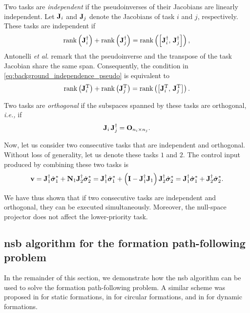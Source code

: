 Two tasks are \emph{independent} if the pseudoinverses of their Jacobians are linearly independent.
Let $\mathbf{J}_i$ and $\mathbf{J}_j$ denote the Jacobians of task $i$ and $j$, respectively.
These tasks are independent if
\begin{equation}
    {\operatorname*{rank}} \left(\mathbf{J}_i^{\dagger}\right) + {\operatorname*{rank}} \left(\mathbf{J}_j^{\dagger}\right) = {\rm rank} \left(\left[ \mathbf{J}_i^{\dagger},\, \mathbf{J}_j^{\dagger} \right]\right),
    \label{eq:background_independence_pseudo}
\end{equation}
Antonelli \emph{et al.} \cite{antonelli_stability_2008} remark that the pseudoinverse and the transpose of the task Jacobian share the same span.
Consequently, the condition in \eqref{eq:background_independence_pseudo} is equivalent to
\begin{equation}
    {\operatorname*{rank}} \left(\mathbf{J}_i^{\mathrm{T}}\right) + {\operatorname*{rank}} \left(\mathbf{J}_j^{\mathrm{T}}\right) = {\rm rank} \left(\left[ \mathbf{J}_i^{\mathrm{T}},\, \mathbf{J}_j^{\mathrm{T}} \right]\right).
    \label{eq:background_independence}
\end{equation}

Two tasks are \emph{orthogonal} if the subspaces spanned by these tasks are orthogonal, \emph{i.e.,} if
\begin{equation}
    \mathbf{J}_i \, \mathbf{J}_j^{\dagger} = \mathbf{O}_{n_i \times n_j}.
\end{equation}

Now, let us consider two consecutive tasks that are independent and orthogonal. 
Without loss of generality, let us denote these tasks $1$ and $2$.
The control input produced by combining these two tasks is
\begin{equation}
    \mathbf{v} = \mathbf{J}_1^{\dagger} \dot{\bm{\sigma}}_1^{*} + \mathbf{N}_1 \mathbf{J}_2^{\dagger} \dot{\bm{\sigma}}_2^{*}
    = \mathbf{J}_1^{\dagger} \dot{\bm{\sigma}}_1^{*} + \left(\mathbf{I} - \mathbf{J}_1^{\dagger}\mathbf{J}_1\right) \mathbf{J}_2^{\dagger} \dot{\bm{\sigma}}_2^{*}
    = \mathbf{J}_1^{\dagger} \dot{\bm{\sigma}}_1^{*} + \mathbf{J}_2^{\dagger} \dot{\bm{\sigma}}_2^{*}.
\end{equation}

We have thus shown that if two consecutive tasks are independent and orthogonal, they can be executed simultaneously.
Moreover, the null-space projector does not affect the lower-priority task.

\subsection{\gls{nsb} algorithm for the formation path-following problem}
\label{sec:background_nsb_formation_path_following}
In the remainder of this section, we demonstrate how the \gls{nsb} algorithm can be used to solve the formation path-following problem.
A similar scheme was proposed in \cite{arrichiello_formation_2006} for static formations, in \cite{antonelli_2006_kinematic,antonelli_stability_2008} for circular formations, and in \cite{eek_formation_2021} for dynamic formations.

